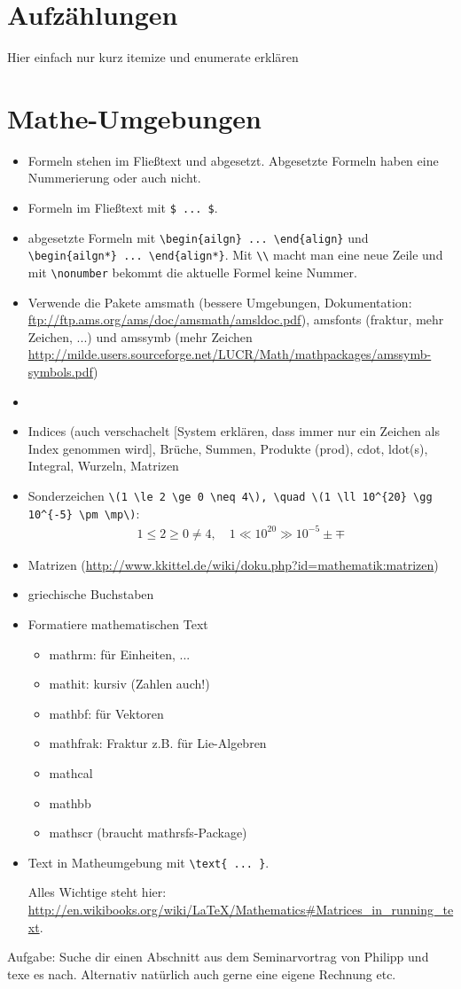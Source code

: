 \documentclass[11pt,a4paper]{scrartcl}
\begin{document}
\section{Aufzählungen}
Hier einfach nur kurz itemize und enumerate erklären

\section{Mathe-Umgebungen}
\begin{itemize}
\item Formeln stehen im Fließtext und abgesetzt. Abgesetzte Formeln haben eine Nummerierung oder auch nicht.
\item Formeln im Fließtext mit \verb|$ ... $|.
\item abgesetzte Formeln mit \verb|\begin{ailgn} ... \end{align}| und \verb|\begin{ailgn*} ... \end{align*}|. Mit \verb|\\| macht man eine neue Zeile und mit \verb|\nonumber| bekommt die aktuelle Formel keine Nummer.
\item Verwende die Pakete amsmath (bessere Umgebungen, Dokumentation: \url{ftp://ftp.ams.org/ams/doc/amsmath/amsldoc.pdf}), amsfonts (fraktur, mehr Zeichen, ...) und amssymb (mehr Zeichen \url{http://milde.users.sourceforge.net/LUCR/Math/mathpackages/amssymb-symbols.pdf})
\item 
\item Indices (auch verschachelt [System erklären, dass immer nur ein Zeichen als Index genommen wird], Brüche, Summen, Produkte (prod), cdot, ldot(s), Integral, Wurzeln, Matrizen
\item Sonderzeichen \verb|\(1 \le 2 \ge 0 \neq 4\), \quad \(1 \ll 10^{20} \gg 10^{-5} \pm \mp\)|:
  \begin{align*}
  1 \le 2 \ge 0 \neq 4, \quad 1 \ll 10^{20} \gg 10^{-5} \pm \mp
  \end{align*}
\item Matrizen (\url{http://www.kkittel.de/wiki/doku.php?id=mathematik:matrizen})
\item griechische Buchstaben
\item Formatiere mathematischen Text
  \begin{itemize}
  \item mathrm: für Einheiten, ...
  \item mathit: kursiv (Zahlen auch!)
  \item mathbf: für Vektoren
  \item mathfrak: Fraktur z.B. für Lie-Algebren
  \item mathcal
  \item mathbb
  \item mathscr (braucht mathrsfs-Package)
  \end{itemize}
\item Text in Matheumgebung mit \verb|\text{ ... }|.

Alles Wichtige steht hier: \url{http://en.wikibooks.org/wiki/LaTeX/Mathematics#Matrices_in_running_text}.

\end{itemize} 

Aufgabe: Suche dir einen Abschnitt aus dem Seminarvortrag von Philipp und texe es nach. Alternativ natürlich auch gerne eine eigene Rechnung etc.
\end{document}
